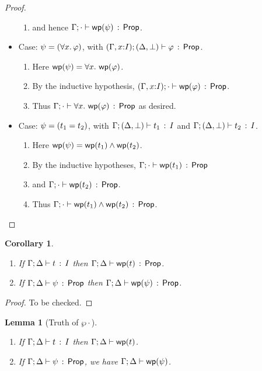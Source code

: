 \documentclass[10pt,a4paper]{article}
\newtheorem{lemma}[theorem]{Lemma}
\newtheorem{corollary}[theorem]{Corollary}
\begin{document}
\begin{proof}
\begin{itemize}
\begin{enumerate}
       \item
         and hence $\Gamma;\cdot \vdash \mathop{\mathsf{wp}}(\psi)\, :\, \mathsf{Prop}$.
       \end{enumerate}
  \item Case: $\psi=(\forall x.\, \varphi)$, 
        with $(\Gamma,x{:}I);(\Delta,\bot) \vdash \varphi\, :\, \mathsf{Prop}$.
  	\begin{enumerate}
	\item 
		Here $\mathop{\mathsf{wp}}(\psi) = \forall x.\, \mathop{\mathsf{wp}}(\varphi)$.
	\item 
		By the inductive hypothesis,
	   $(\Gamma,x{:}I);\cdot \vdash \mathop{\mathsf{wp}}(\varphi)\, :\, \mathsf{Prop}$.
	\item 
		Thus
	   $\Gamma;\cdot \vdash \forall x.\, \mathop{\mathsf{wp}}(\varphi)\, :\, \mathsf{Prop}$ as desired.
	\end{enumerate}
  \item Case: $\psi = (t_1 = t_2)$, with $\Gamma;(\Delta,\bot) \vdash t_1\, :\, I$ and $\Gamma;(\Delta,\bot) \vdash t_2\, :\, I$. 
    	\begin{enumerate}
	\item 
		Here $\mathop{\mathsf{wp}}(\psi) = \mathop{\mathsf{wp}}(t_1) \wedge \mathop{\mathsf{wp}}(t_2)$.
	\item 
		By the inductive hypotheses,
		$\Gamma;\cdot \vdash \mathop{\mathsf{wp}}(t_1)\, :\, \mathsf{Prop}$ 
	\item 
		and $\Gamma;\cdot \vdash \mathop{\mathsf{wp}}(t_2)\, :\, \mathsf{Prop}$.
	\item
		Thus $\Gamma;\cdot \vdash \mathop{\mathsf{wp}}(t_1) \wedge \mathop{\mathsf{wp}}(t_2)\, :\, \mathsf{Prop}$.
	\end{enumerate}
  \end{itemize}
\end{proof}

\begin{corollary}
\mbox{}
\begin{enumerate}
\item If $\Gamma;\Delta \vdash t\, :\, I$ then
  $\Gamma;\Delta \vdash \mathop{\mathsf{wp}}(t)\, :\, \mathsf{Prop}$.
\item If $\Gamma;\Delta \vdash \psi\, :\, \mathsf{Prop}$ then
  $\Gamma;\Delta \vdash \mathop{\mathsf{wp}}(\psi)\, :\, \mathsf{Prop}$.
\end{enumerate}
\end{corollary}

\begin{proof}
To be checked.
\end{proof}

\clearpage

\begin{lemma}[Truth of $\wp{\cdot}$]
\mbox{}
  \begin{enumerate}
  \item If $\Gamma;\Delta \vdash t\, :\, I$ then
    $\Gamma;\Delta \vdash \mathop{\mathsf{wp}}(t)$.
  \item If $\Gamma;\Delta \vdash \psi\, :\, \mathsf{Prop}$, we have
    $\Gamma;\Delta \vdash \mathop{\mathsf{wp}}(\psi)$.
  \end{enumerate}
\end{lemma}
\end{document}
